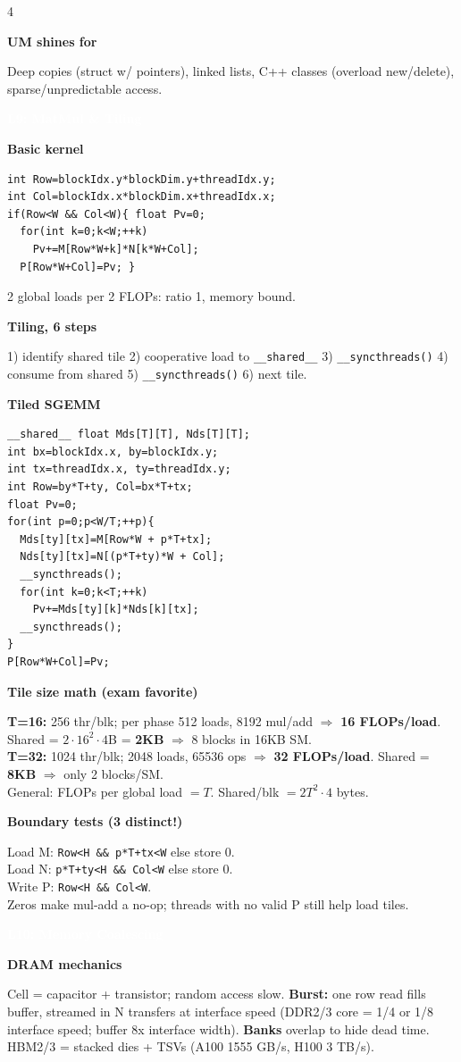 \documentclass[10pt]{extarticle}
\newcommand{\sect}[1]{\vspace{3pt}\par\colorbox{hdr}{\textcolor{white}{\textbf{\small #1}}}\par\vspace{2pt}}
\newcommand{\sub}[1]{\vspace{2pt}\par\textbf{\footnotesize\textcolor{hdr}{#1}}\par}
\begin{document}
\begin{multicols*}{4}
\sub{UM shines for}
Deep copies (struct w/ pointers), linked lists, C++ classes (overload new/delete), sparse/unpredictable access.

\sect{L9: MatMul \& Tiling}
\sub{Basic kernel}
\begin{lstlisting}
int Row=blockIdx.y*blockDim.y+threadIdx.y;
int Col=blockIdx.x*blockDim.x+threadIdx.x;
if(Row<W && Col<W){ float Pv=0;
  for(int k=0;k<W;++k)
    Pv+=M[Row*W+k]*N[k*W+Col];
  P[Row*W+Col]=Pv; }
\end{lstlisting}
2 global loads per 2 FLOPs: ratio 1, memory bound.

\sub{Tiling, 6 steps}
1) identify shared tile 2) cooperative load to \texttt{\_\_shared\_\_} 3) \texttt{\_\_syncthreads()} 4) consume from shared 5) \texttt{\_\_syncthreads()} 6) next tile.

\sub{Tiled SGEMM}
\begin{lstlisting}
__shared__ float Mds[T][T], Nds[T][T];
int bx=blockIdx.x, by=blockIdx.y;
int tx=threadIdx.x, ty=threadIdx.y;
int Row=by*T+ty, Col=bx*T+tx;
float Pv=0;
for(int p=0;p<W/T;++p){
  Mds[ty][tx]=M[Row*W + p*T+tx];
  Nds[ty][tx]=N[(p*T+ty)*W + Col];
  __syncthreads();
  for(int k=0;k<T;++k)
    Pv+=Mds[ty][k]*Nds[k][tx];
  __syncthreads();
}
P[Row*W+Col]=Pv;
\end{lstlisting}

\sub{Tile size math (exam favorite)}
\textbf{T=16:} 256 thr/blk; per phase 512 loads, 8192 mul/add $\Rightarrow$ \textbf{16 FLOPs/load}. Shared = $2{\cdot}16^2{\cdot}4$B = \textbf{2KB} $\Rightarrow$ 8 blocks in 16KB SM.\\
\textbf{T=32:} 1024 thr/blk; 2048 loads, 65536 ops $\Rightarrow$ \textbf{32 FLOPs/load}. Shared = \textbf{8KB} $\Rightarrow$ only 2 blocks/SM.\\
General: FLOPs per global load $= T$. Shared/blk $= 2T^2{\cdot}4$ bytes.

\sub{Boundary tests (3 distinct!)}
Load M: \texttt{Row<H \&\& p*T+tx<W} else store 0.\\
Load N: \texttt{p*T+ty<H \&\& Col<W} else store 0.\\
Write P: \texttt{Row<H \&\& Col<W}.\\
Zeros make mul-add a no-op; threads with no valid P still help load tiles.

\sect{L10: Memory Coalescing}
\sub{DRAM mechanics}
Cell = capacitor + transistor; random access slow. \textbf{Burst:} one row read fills buffer, streamed in N transfers at interface speed (DDR2/3 core = 1/4 or 1/8 interface speed; buffer 8x interface width). \textbf{Banks} overlap to hide dead time. HBM2/3 = stacked dies + TSVs (A100 1555 GB/s, H100 3 TB/s).


\end{multicols*}
\end{document}
